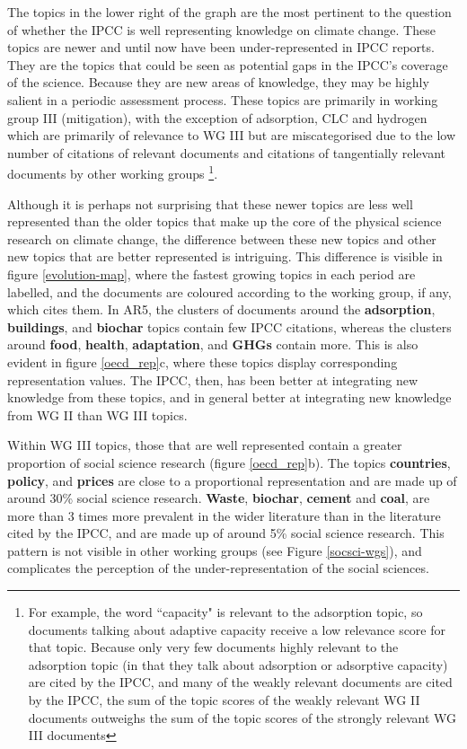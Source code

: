 \documentclass{article}
\begin{document}
\begin{linenumbers}
		The topics in the lower right of the graph are the most pertinent to the question of whether the IPCC is well representing knowledge on climate change. These topics are newer and until now have been under-represented in IPCC reports. They are the topics that could be seen as potential gaps in the IPCC's coverage of the science. Because they are new areas of knowledge, they may be highly salient in a periodic assessment process. These topics are primarily in working group III (mitigation), with the exception of adsorption, CLC and hydrogen which are primarily of relevance to WG III but are miscategorised due to the low number of citations of relevant documents and citations of tangentially relevant documents by other working groups \footnote{For example, the word ``capacity" is relevant to the adsorption topic, so documents talking about adaptive capacity receive a low relevance score for that topic. Because only very few documents highly relevant to the adsorption topic (in that they talk about adsorption or adsorptive capacity) are cited by the IPCC, and many of the weakly relevant documents are cited by the IPCC, the sum of the topic scores of the weakly relevant WG II documents outweighs the sum of the topic scores of the strongly relevant WG III documents}.
		
		Although it is perhaps not surprising that these newer topics are less well represented than the older topics that make up the core of the physical science research on climate change, the difference between these new topics and other new topics that are better represented is intriguing. This difference is visible in figure \ref{evolution-map}, where the fastest growing topics in each period are labelled, and the documents are coloured according to the working group, if any, which cites them. In AR5, the clusters of documents around the \textbf{adsorption}, \textbf{buildings}, and \textbf{biochar} topics contain few IPCC citations, whereas the clusters around \textbf{food}, \textbf{health}, \textbf{adaptation}, and \textbf{GHGs} contain more. This is also evident in figure \ref{oecd_rep}c, where these topics display corresponding representation values. The IPCC, then, has been better at integrating new knowledge from these topics, and in general better at integrating new knowledge from WG II  than WG III topics.
		
		Within WG III topics, those that are well represented contain a greater proportion of social science research (figure \ref{oecd_rep}b). The topics \textbf{countries}, \textbf{policy}, and \textbf{prices} are close to a proportional representation and are made up of around 30\% social science research. \textbf{Waste}, \textbf{biochar}, \textbf{cement} and \textbf{coal}, are more than 3 times more prevalent in the wider literature than in the literature cited by the IPCC, and are made up of around 5\% social science research. This pattern is not visible in other working groups (see Figure \ref{socsci-wgs}), and complicates the perception of the under-representation of the social sciences.
		

\end{linenumbers}
\end{document}
